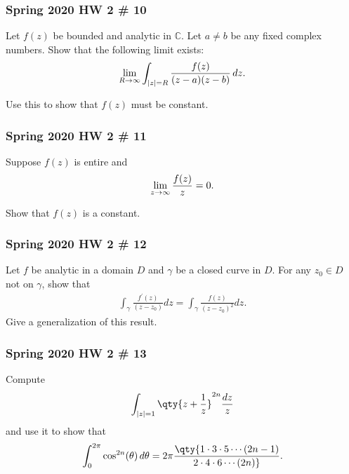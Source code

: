 \hypertarget{spring-2020-hw-2-10}{%
\subsubsection{Spring 2020 HW 2 \# 10}\label{spring-2020-hw-2-10}}

Let \(f(z)\) be bounded and analytic in \({\mathbb{C}}\). Let
\(a\neq b\) be any fixed complex numbers. Show that the following limit
exists:
\begin{align*}
\lim_{R\to \infty} \int_{{\left\lvert {z} \right\rvert} = R} {f(z) \over (z-a)(z-b)} \,dz
.\end{align*}

Use this to show that \(f(z)\) must be constant.

\hypertarget{spring-2020-hw-2-11}{%
\subsubsection{Spring 2020 HW 2 \# 11}\label{spring-2020-hw-2-11}}

Suppose \(f(z)\) is entire and
\begin{align*}
\lim_{z\to\infty} {f(z) \over z} = 0
.\end{align*}

Show that \(f(z)\) is a constant.

\hypertarget{spring-2020-hw-2-12}{%
\subsubsection{Spring 2020 HW 2 \# 12}\label{spring-2020-hw-2-12}}

Let \(f\) be analytic in a domain \(D\) and \(\gamma\) be a closed curve
in \(D\). For any \(z_0\in D\) not on \(\gamma\), show that
\begin{align*}
\int_{\gamma} \frac{f^{\prime}(z)}{\left(z-z_{0}\right)} d z=\int_{\gamma} \frac{f(z)}{\left(z-z_{0}\right)^{2}} d z
.\end{align*}
Give a generalization of this result.

\hypertarget{spring-2020-hw-2-13}{%
\subsubsection{Spring 2020 HW 2 \# 13}\label{spring-2020-hw-2-13}}

Compute
\begin{align*}
\int_{{\left\lvert {z} \right\rvert} = 1} \qty{z + {1\over z}}^{2n} {dz \over z}
\end{align*}
and use it to show that
\begin{align*}
\int_0^{2\pi} \cos^{2n}(\theta) \, d\theta = 2\pi \qty{1\cdot 3 \cdot 5 \cdots (2n-1) \over 2 \cdot 4 \cdot 6 \cdots (2n)}
.\end{align*}

